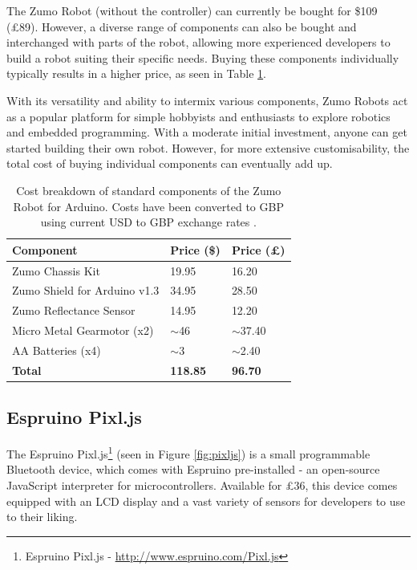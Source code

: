 \documentclass{l4proj}
\begin{document}
The Zumo Robot (without the controller) can currently be bought for \$109 (£89). However, a diverse range of components can also be bought and interchanged with parts of the robot, allowing more experienced developers to build a robot suiting their specific needs. Buying these components individually typically results in a higher price, as seen in Table \ref{tab:zumo-robot-components}.

With its versatility and ability to intermix various components, Zumo Robots act as a popular platform for simple hobbyists and enthusiasts to explore robotics and embedded programming. With a moderate initial investment, anyone can get started building their own robot. However, for more extensive customisability, the total cost of buying individual components can eventually add up.

\begin{table}[h!]
\centering
\caption{Cost breakdown of standard components of the Zumo Robot for Arduino. Costs have been converted to GBP using current USD to GBP exchange rates \citep{exchangerates}.}
\label{tab:zumo-robot-components}
\begin{tabular}{|l|l|l|}
\hline
Component & Price (\$) & Price (£) \\ \hline
Zumo Chassis Kit & 19.95 & 16.20 \\ \hline
Zumo Shield for Arduino v1.3 & 34.95 & 28.50\\ \hline
Zumo Reflectance Sensor & 14.95 & 12.20 \\ \hline
Micro Metal Gearmotor (x2) & $\sim$46 & $\sim$37.40 \\ \hline
AA Batteries (x4) & $\sim$3 & $\sim$2.40 \\ \hline
\textbf{Total} & \textbf{118.85} & \textbf{96.70} \\ \hline
\end{tabular}
\end{table}

\subsection{Espruino Pixl.js}\label{sec:pixl-background}
The Espruino Pixl.js\footnote{Espruino Pixl.js - \url{http://www.espruino.com/Pixl.js}} (seen in Figure \ref{fig:pixljs}) is a small programmable Bluetooth device, which comes with Espruino pre-installed - an open-source JavaScript interpreter for microcontrollers. Available for £36, this device comes equipped with an LCD display and a vast variety of sensors for developers to use to their liking. 
\end{document}
